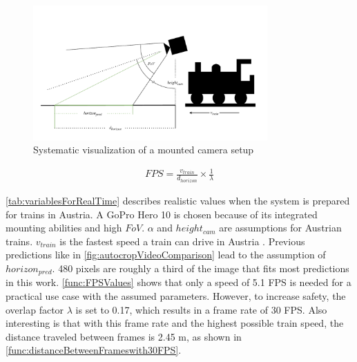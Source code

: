 \begin{figure}[H]
    \centering
    \includegraphics[width=0.8\textwidth]{PICs/discussion/Kameraaufbau.pdf}
    \caption{Systematic visualization of a mounted camera setup}
    \label{fig:cameraSetup}
\end{figure}

\begin{align}
    FPS = \frac{v_{train}}{d_{horizon}} \times \frac{1}{\lambda}
    \label{func:RealTime}
\end{align}

\clearpage

\noindent \autoref{tab:variablesForRealTime} describes realistic values when the system is prepared for trains in Austria.
A GoPro Hero 10 \cite{goproHero10} is chosen because of its integrated mounting abilities and high $FoV$.
$\alpha$ and $height_{cam}$ are assumptions for Austrian trains.
$v_{train}$ is the fastest speed a train can drive in Austria \cite{geschwindigkeitZugAustria}.
Previous predictions like in \autoref{fig:autocropVideoComparison} lead to the assumption of $horizon_{pred}$.
480 pixels are roughly a third of the image that fits most predictions in this work.
\autoref{func:FPSValues} shows that only a speed of 5.1 \ac{FPS} is needed for a practical use case with the assumed parameters.
However, to increase safety, the overlap factor $\lambda$ is set to 0.17, which results in a frame rate of 30 \ac{FPS}.
Also interesting is that with this frame rate and the highest possible train speed, the distance traveled between frames is 2.45 m, as shown in \autoref{func:distanceBetweenFrameswith30FPS}.

